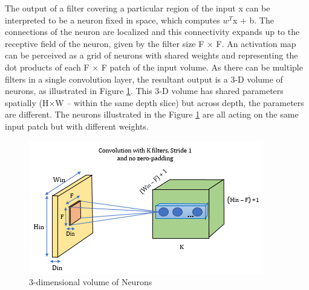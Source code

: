The output of a filter covering a particular region of the input x can be interpreted to be a neuron fixed in space, which computes $w^T$x + b. The connections of the neuron are localized and this connectivity expands up to the receptive field of the neuron, given by the filter size F × F. An activation map can be perceived as a grid of neurons with shared weights and representing the dot products of each F × F patch of the input volume. As there can be multiple filters in a single convolution layer, the resultant output is a 3-D volume of neurons, as illustrated in Figure \ref{fig:ConvLayer_1}. This 3-D volume has shared parameters spatially (H×W – within the same depth slice) but across depth, the parameters are different. The neurons illustrated in the Figure \ref{fig:ConvLayer_1} are all acting on the same input patch but with different weights. 
\begin{figure}[h!]
  \centering
  \includegraphics[width=0.7\linewidth]{figures/ConvLayer_1.PNG}
  \caption{3-dimensional volume of Neurons
  \cite{cnn_ytak}}
  \label{fig:ConvLayer_1}
\end{figure}
